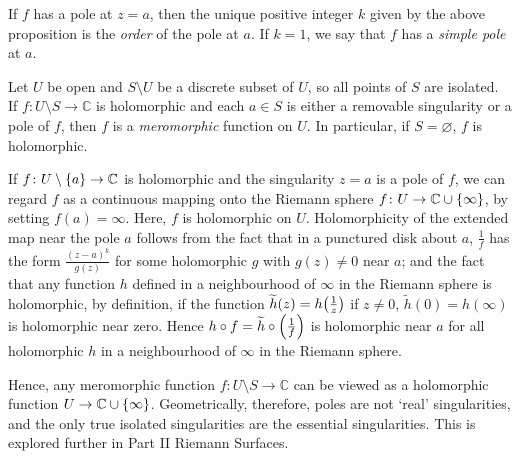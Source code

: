 \begin{definition}
	If \( f \) has a pole at \( z = a \), then the unique positive integer \( k \) given by the above proposition is the \textit{order} of the pole at \( a \).
	If \( k = 1 \), we say that \( f \) has a \textit{simple pole} at \( a \).

	Let \( U \) be open and \( S \setminus U \) be a discrete subset of \( U \), so all points of \( S \) are isolated.
	If \( f \colon U \setminus S \to \mathbb C \) is holomorphic and each \( a \in S \) is either a removable singularity or a pole of \( f \), then \( f \) is a \textit{meromorphic} function on \( U \).
	In particular, if \( S = \varnothing \), \( f \) is holomorphic.
\end{definition}
\begin{remark}
	If \( f \colon U \setminus \qty{a} \to \mathbb C \) is holomorphic and the singularity \( z = a \) is a pole of \( f \), we can regard \( f \) as a continuous mapping onto the Riemann sphere \( f \colon U \to \mathbb C \cup \qty{\infty} \), by setting \( f(a) = \infty \).
	Here, \( f \) is holomorphic on \( U \).
	Holomorphicity of the extended map near the pole \( a \) follows from the fact that in a punctured disk about \( a \), \( \frac{1}{f} \) has the form \( \frac{(z-a)^k}{g(z)} \) for some holomorphic \( g \) with \( g(z) \neq 0 \) near \( a \); and the fact that any function \( h \) defined in a neighbourhood of \( \infty \) in the Riemann sphere is holomorphic, by definition, if the function \( \widetilde h(z) = h\qty(\frac{1}{z}) \) if \( z \neq 0 \), \( \widetilde h(0) = h(\infty) \) is holomorphic near zero.
	Hence \( h \circ f = \widetilde h \circ \qty(\frac{1}{f}) \) is holomorphic near \( a \) for all holomorphic \( h \) in a neighbourhood of \( \infty \) in the Riemann sphere.

	Hence, any meromorphic function \( f \colon U \setminus S \to \mathbb C \) can be viewed as a holomorphic function \( U \to \mathbb C \cup \qty{\infty} \).
	Geometrically, therefore, poles are not `real' singularities, and the only true isolated singularities are the essential singularities.
	This is explored further in Part II Riemann Surfaces.
\end{remark}

